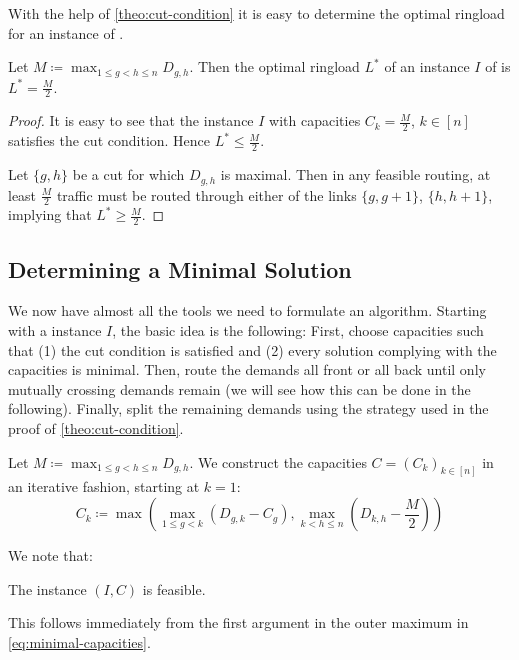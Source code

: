 With the help of \cref{theo:cut-condition} it is easy to determine the optimal ringload for an instance of \RRL.
\begin{corollary}
	\label{cor:ringload}
	Let $M \coloneqq \max_{1 \leq g < h \leq n} D_{g, h}$.
	Then the optimal ringload $L^\ast$ of an instance $I$ of \RRL is $L^\ast = \frac{M}{2}$.
\end{corollary}
\begin{proof}
	It is easy to see that the instance $I$ with capacities $C_k = \frac{M}{2}$, $k \in [n]$ satisfies the cut condition.
	Hence $L^\ast \leq \frac{M}{2}$.
	
	Let $\{g, h\}$ be a cut for which $D_{g, h}$ is maximal.
	Then in any feasible routing, at least $\frac{M}{2}$ traffic must be routed through either of the links $\{g, g+1\}$, $\{h, h+1\}$, implying that $L^\ast \geq \frac{M}{2}$.
\end{proof}
\subsection{Determining a Minimal Solution}

We now have almost all the tools we need to formulate an algorithm.
Starting with a \RRL instance $I$, the basic idea is the following:
First, choose capacities such that (1) the cut condition is satisfied and (2) every solution complying with the capacities is minimal.
Then, route the demands all front or all back until only mutually crossing demands remain (we will see how this can be done in the following).
Finally, split the remaining demands using the strategy used in the proof of \cref{theo:cut-condition}.

Let $M \coloneqq \max_{1 \leq g < h \leq n} D_{g, h}$.
We construct the capacities $C = (C_k)_{k \in [n]}$ in an iterative fashion, starting at $k = 1$:
\begin{equation}
	\label{eq:minimal-capacities}
	C_k \coloneqq \max \left(\max_{1 \leq g < k}(D_{g, k} - C_g), \max_{k < h \leq n}(D_{k, h} - \frac{M}{2})\right)
\end{equation}

We note that:
\begin{proposition}
	The instance $(I, C)$ is feasible.
\end{proposition}
This follows immediately from the first argument in the outer maximum in \cref{eq:minimal-capacities}.

